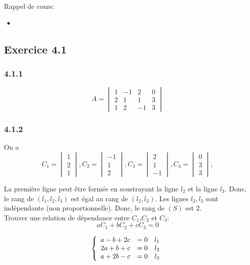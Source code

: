 \documentclass[]{book}
\theoremstyle{definition}
\begin{document}
Rappel de cours: 
\begin{itemize}
\item 
\end{itemize}

 

\subsection*{Exercice 4.1}
\subsubsection*{4.1.1}

$$A = 
\begin{vmatrix}
1 & -1 & 2 & 0 \\
2 & 1 & 1 & 3 \\
1 & 2 & -1 & 3 
\end{vmatrix}
$$

\subsubsection*{4.1.2}
On a 
$$
C_1 = \begin{vmatrix} 1 \\ 2 \\ 1 \end{vmatrix},
C_2 = \begin{vmatrix} -1 \\ 1 \\ 2 \end{vmatrix},
C_3 = \begin{vmatrix} 2 \\ 1 \\ -1 \end{vmatrix},
C_4 = \begin{vmatrix} 0 \\ 3 \\ 3 \end{vmatrix},
$$

La premi\`ere ligne peut \^etre form\'ee en soustrayant la ligne $l_2$ et la ligne $l_3$. Donc, le rang de $(l_1, l_2, l_3)$ est \'egal au rang de $(l_2, l_3)$. Les lignes $l_2, l_3$ sont ind\'ependante (non proportionnelle). Donc, le rang de $(S)$ est $2$.\\

Trouver une relation de d\'ependance entre $C_1$,$C_2$ et $C_3$:\\
$$aC_1+bC_2+cC_3 = 0$$

$$
\left\{ 
\begin{array}{l l l}
a - b + 2c & = 0 & l_1 \\
2a + b + c & = 0 & l_2 \\
a + 2b -c & = 0 & l_3 \\
\end{array}
\right. 
$$
\end{document}
